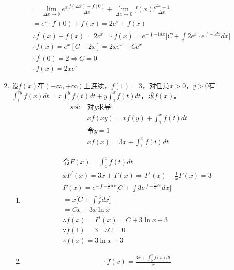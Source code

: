 \begin{enumerate}[{例}1.]
\begin{align*}
                &=\lim_{\Delta x\to 0}e^x\frac{f(\Delta x)-f(0)}{\Delta x}+\lim_{\Delta x\to 0}f(x)\frac{e^{\Delta x}-1}{\Delta x}\\
                &=e^x\cdot f^{\prime}(0)+f(x)=2e^x+f(x)\\
                &\therefore f^{\prime}(x)-f(x)=2e^x\Rightarrow f(x)=e^{-\int -1dx}\Big[C+\int2e^x\cdot e^{\int -1dx}dx\Big]\\
                &\therefore f(x)=e^x[C+2x]=2xe^x+Ce^x\\
                &\because f^{\prime}(0)=2\Rightarrow C=0\\
                &\therefore f(x)=2xe^x
        \end{align*}
    \item 设$f(x)$在$(-\infty,+\infty)$上连续，$f(1)=3$，对任意$x>0$，$y>0$有$\int_1^{xy}f(x)dt=x\int_1^y f(t)dt+y\int_1^x f(t)dt$，求$f(x)$。
        \begin{align*}
            sol:&\mbox{对}y\mbox{求导}:\\
                &xf(xy)=xf(y)+\int_1^xf(t)dt\\
                &\mbox{令}y=1\\
                &xf(x)=3x+\int_1^xf(t)dt
        \end{align*}
        \begin{enumerate}[$1^\circ$]
            \item
                \begin{align*}
                    &\mbox{令}F(x)=\int_1^xf(t)dt\\
                    &xF^{\prime}(x)=3x+F(x)\Rightarrow F^{\prime}(x)-\frac{1}{x}F(x)=3\\
                    &F(x)=e^{-\int -\frac{1}{x}dx}\bigg[C+\int 3e^{\int -\frac{1}{x}dx}dx\bigg]\\
                    &=x\Big[C+\int \frac{3}{x}dx\Big]\\
                    &=Cx+3x\ln x\\
                    &\therefore f(x)=F^{\prime}(x)=C+3\ln x+3\\
                    &\because f(1)=3\quad\therefore C=0\\
                    &\therefore f(x)=3\ln x+3
                \end{align*}
            \item
                \begin{align*}
                    &\because f(x)=\frac{3x+\int_0^x f(t)dt}{x}\\

\end{align*}
\end{enumerate}
\end{enumerate}
